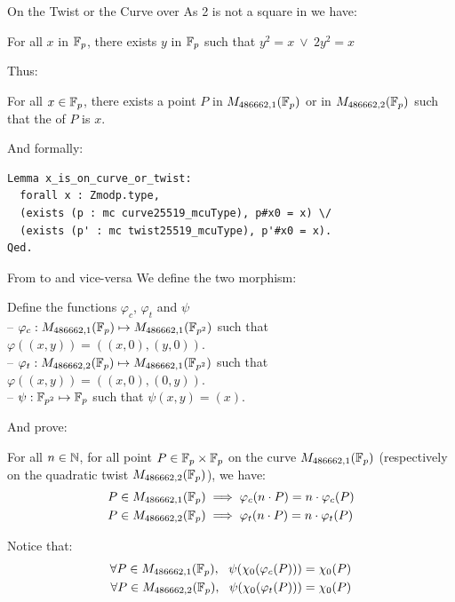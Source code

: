 \documentclass[8pt,aspectratio=169]{beamer}
\begin{document}
%
%
\begin{frame}[fragile]{On the Twist or the Curve over }
	As 2 is not a square in  we have:
	\begin{lemma}
		For all $x$ in $\mathbb{F}_{p}$, there exists $y$ in $\mathbb{F}_{p}$ such that
		$y^2 = x\ \lor\ 2y^2 = x$
	\end{lemma}

	Thus:
	\begin{lemma}
		For all $x \in \mathbb{F}_{p}$, there exists a point $P$ in $M_{486662,1}(\mathbb{F}_{p})$ or
		in $M_{486662,2}(\mathbb{F}_{p})$ such that the \xcoord of $P$ is $x$.
	\end{lemma}

	And formally:
	\begin{lstlisting}[language=Coq, basicstyle=\normalsize]
Lemma x_is_on_curve_or_twist:
  forall x : Zmodp.type,
  (exists (p : mc curve25519_mcuType), p#x0 = x) \/
  (exists (p' : mc twist25519_mcuType), p'#x0 = x).
Qed.
\end{lstlisting}
\end{frame}


%
%
\begin{frame}{From  to  and vice-versa}
	We define the two morphism:
	\begin{dfn}
		Define the functions $\varphi_c$, $\varphi_t$ and $\psi$\\
		-- $\varphi_c: M_{486662,1}(\mathbb{F}_{p}) \mapsto M_{486662,1}(\mathbb{F}_{p^2})$ such that $\varphi((x,y)) = ((x,0), (y,0))$.\\
		-- $\varphi_t: M_{486662,2}(\mathbb{F}_{p}) \mapsto M_{486662,1}(\mathbb{F}_{p^2})$ such that $\varphi((x,y)) = ((x,0), (0,y))$.\\
		-- $\psi: \mathbb{F}_{p^2} \mapsto \mathbb{F}_{p}$ such that $\psi(x,y) = (x)$.
	\end{dfn}

	And prove:
	\begin{lemma}
		For all $n \in \mathbb{N}$, for all point $P\in\mathbb{F}_{p}\times\mathbb{F}_{p}$ on the curve
		$M_{486662,1}(\mathbb{F}_{p})$ (respectively on the quadratic twist $M_{486662,2}(\mathbb{F}_{p})$), we have:
		\begin{align*}
			P \in M_{486662,1}(\mathbb{F}_{p}) & \implies \varphi_c(n \cdot P) = n \cdot \varphi_c(P) \\
			P \in M_{486662,2}(\mathbb{F}_{p}) & \implies \varphi_t(n \cdot P) = n \cdot \varphi_t(P)
		\end{align*}
	\end{lemma}

	Notice that:
	\begin{align*}
		\forall P \in M_{486662,1}(\mathbb{F}_{p}),\ \ \psi(\chi_0(\varphi_c(P))) = \chi_0(P) \\
		\forall P \in M_{486662,2}(\mathbb{F}_{p}),\ \ \psi(\chi_0(\varphi_t(P))) = \chi_0(P)
	\end{align*}

\end{frame}
\end{document}
